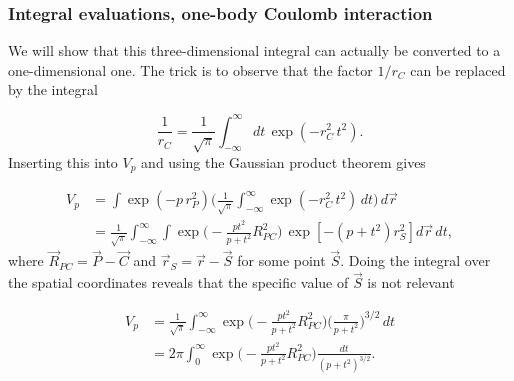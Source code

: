 \documentclass{beamer}
\begin{document}
\begin{frame}
\frametitle{Integral evaluations, one-body Coulomb interaction}

\begin{block}{}

We will show that this three-dimensional integral can actually be converted to a one-dimensional one. The trick is to observe that the factor $1/r_C$ can be replaced by the integral

\begin{equation}
 \frac{1}{r_C} = \frac{1}{\sqrt{\pi}}\int_{-\infty}^\infty dt\,\exp(-r^2_C\,t^2).
\end{equation}
Inserting this into $V_p$ and using the Gaussian product theorem gives

\begin{align}
 V_p & =  \int \exp(-p\,r_P^2)\Big(\frac{1}{\sqrt{\pi}}\int_{-\infty}^\infty\exp(-r^2_C\,t^2)\,dt\Big)\,d\vec r \\
     & =  \frac{1}{\sqrt{\pi}}\int_{-\infty}^\infty\int\exp\Big(-\frac{pt^2}{p + t^2}R^2_{PC}\Big)\,\exp[-(p + t^2)r^2_S] d\vec r\, dt,
\end{align}
where $\vec R_{PC} = \vec P - \vec C$ and $\vec r_S = \vec r - \vec S$ for some point $\vec S$. Doing the integral over the spatial coordinates reveals that the specific value of $\vec S$ is not relevant

\begin{align}
 V_p & =  \frac{1}{\sqrt{\pi}}\int_{-\infty}^\infty\exp\Big(-\frac{pt^2}{p + t^2}R^2_{PC}\Big)\Big(\frac{\pi}{p + t^2}\Big)^{3/2}\,dt \\
     & =  2\pi\int_0^\infty\exp\Big(-\frac{pt^2}{p + t^2}R^2_{PC}\Big)\frac{dt}{(p + t^2)^{3/2}}.
\end{align}
\end{block}
\end{frame}
\end{document}
